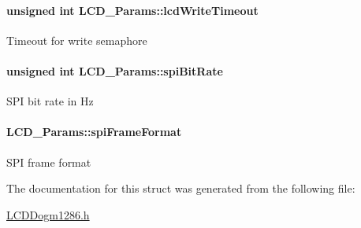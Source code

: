\paragraph[{lcd\-Write\-Timeout}]{\setlength{\rightskip}{0pt plus 5cm}unsigned int L\-C\-D\-\_\-\-Params\-::lcd\-Write\-Timeout}\label{struct_l_c_d___params_a4d0eed4a93a0785c12eb26c48be77a28}
Timeout for write semaphore 
\paragraph[{spi\-Bit\-Rate}]{\setlength{\rightskip}{0pt plus 5cm}unsigned int L\-C\-D\-\_\-\-Params\-::spi\-Bit\-Rate}\label{struct_l_c_d___params_a5670d1d33180c428d0b84154ca658098}
S\-P\-I bit rate in Hz 
\paragraph[{spi\-Frame\-Format}]{ L\-C\-D\-\_\-\-Params\-::spi\-Frame\-Format}\label{struct_l_c_d___params_a27584b38ae256abf6358c4158da5be60}
S\-P\-I frame format 

The documentation for this struct was generated from the following file\-:\begin{DoxyCompactItemize}
\item 
\hyperlink{_l_c_d_dogm1286_8h}{L\-C\-D\-Dogm1286.\-h}\end{DoxyCompactItemize}
